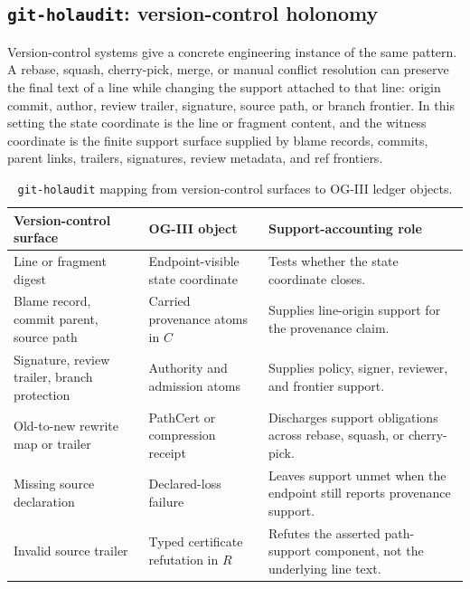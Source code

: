 \documentclass[11pt,twoside]{article}
\newcommand{\OGSchemaTableFont}{\footnotesize}
\newcommand{\OGTableHeaderRow}{\rowcolor{tableheaderbg}}
\newcommand{\TableHeaderRow}{\OGTableHeaderRow}
\newcommand{\OGAltRow}{\rowcolor{tablerowbg}}
\newenvironment{OGTable}[2][ht]{%
  \begin{table}[#1]
  \centering
  #2
  \renewcommand{\arraystretch}{1.08}%
  \rowcolors{2}{tablerowbg}{white}%
}{%
  \rowcolors{2}{}{}%
  \end{table}%
}
\theoremstyle{definition}
\begin{document}
\subsection{\texttt{git-holaudit}: version-control holonomy}
\label{sec:git-holaudit}

Version-control systems give a concrete engineering instance of the same
pattern. A rebase, squash, cherry-pick, merge, or manual conflict resolution
can preserve the final text of a line while changing the support attached to
that line: origin commit, author, review trailer, signature, source path, or
branch frontier. In this setting the state coordinate is the line or fragment
content, and the witness coordinate is the finite support surface supplied by
blame records, commits, parent links, trailers, signatures, review metadata,
and ref frontiers.

\begin{OGTable}{\OGSchemaTableFont}
\begin{tabularx}{\textwidth}{@{}>{\raggedright\arraybackslash}p{}>{\raggedright\arraybackslash}p{}>{\raggedright\arraybackslash}X@{}}
\toprule
\TableHeaderRow \textbf{Version-control surface} & \textbf{OG-III object} & \textbf{Support-accounting role} \\
\midrule
Line or fragment digest & Endpoint-visible state coordinate & Tests whether the state coordinate closes. \\
\OGAltRow
Blame record, commit parent, source path & Carried provenance atoms in $C$ & Supplies line-origin support for the provenance claim. \\
Signature, review trailer, branch protection & Authority and admission atoms & Supplies policy, signer, reviewer, and frontier support. \\
\OGAltRow
Old-to-new rewrite map or trailer & PathCert or compression receipt & Discharges support obligations across rebase, squash, or cherry-pick. \\
Missing source declaration & Declared-loss failure & Leaves support unmet when the endpoint still reports provenance support. \\
\OGAltRow
Invalid source trailer & Typed certificate refutation in $R$ & Refutes the asserted path-support component, not the underlying line text. \\
\bottomrule
\end{tabularx}
\caption{\texttt{git-holaudit} mapping from version-control surfaces to OG-III ledger objects.}
\label{tab:git-holaudit-mapping}
\end{OGTable}
\FloatBarrier
\end{document}
